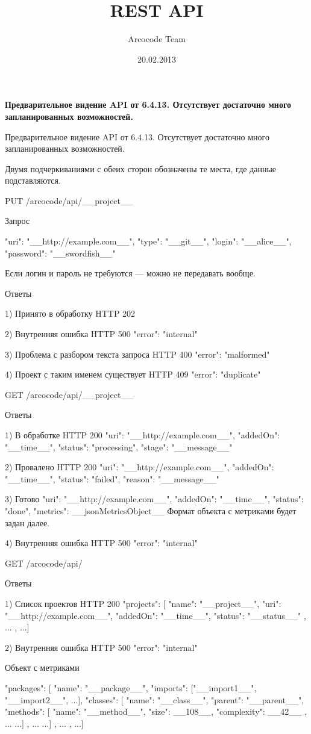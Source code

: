 \documentclass[a4paper,12pt]{article}
\title{REST API}
\date{20.02.2013}
\author{Arcocode Team}
\begin{document}
\maketitle
\newpage
\textbf{Предварительное видение API от 6.4.13. Отсутствует достаточно много запланированных возможностей.}
\newline

	Предварительное видение API от 6.4.13. Отсутствует достаточно много запланированных возможностей.

Двумя подчеркиваниями с обеих сторон обозначены те места, где данные подставляются.


PUT /arcocode/api/__project__

Запрос

{ "uri": "__http://example.com__", "type": "__git__", "login": "__alice__", "password": "__swordfish__" }

Если логин и пароль не требуются — можно не передавать вообще.

Ответы

1) Принято в обработку
HTTP 202
{  }

2) Внутренняя ошибка
HTTP 500
{ "error": "internal" }

3) Проблема с разбором текста запроса
HTTP 400
{ "error": "malformed" }

4) Проект с таким именем существует
HTTP 409
{ "error": "duplicate" }

GET /arcocode/api/__project__

Ответы

1) В обработке
HTTP 200
{ "uri": "__http://example.com__", "addedOn": "__time__", "status": "processing", "stage": "__message__" }

2) Провалено
HTTP 200
{ "uri": "__http://example.com__", "addedOn": "__time__", "status": "failed", "reason": "__message__" }

3) Готово
{ "uri": "__http://example.com__", "addedOn": "__time__", "status": "done", "metrics": __jsonMetricsObject__ }
Формат объекта с метриками будет задан далее.

4) Внутренняя ошибка
HTTP 500
{ "error": "internal" }


GET /arcocode/api/

Ответы

1) Список проектов
HTTP 200
{ "projects": [
	{ "name": "__project__", "uri": "__http://example.com__", "addedOn": "__time__", "status": "__status__" },
	{ ... },
...] }

2) Внутренняя ошибка
HTTP 500
{ "error": "internal" }

Объект с метриками

{ "packages": [
	{ "name": "__package__",
	"imports": ["__import1__", "__import2__", ...],
	"classes": [
		{ "name": "__class__",
		"parent": "__parent__",
		"methods": [
			{ "name": "__method__",
			"size": __108__,
			"complexity": __42__ },
			{ ... }
			...] },
		{ ... }
	...] },
	{ ... },
...] }
\end{document}
